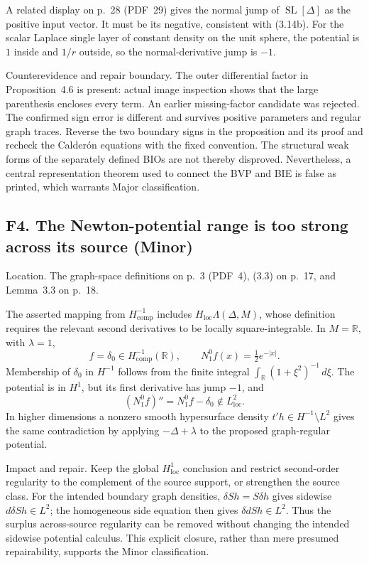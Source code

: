 \documentclass[10pt]{article}
\begin{document}
A related display on p. 28 (PDF 29) gives the normal jump of \(\operatorname{SL}[\Delta]\) as the positive input vector. It must be its negative, consistent with (3.14b). For the scalar Laplace single layer of constant density on the unit sphere, the potential is \(1\) inside and \(1/r\) outside, so the normal-derivative jump is \(-1\).\par
Counterevidence and repair boundary. The outer differential factor in Proposition 4.6 is present: actual image inspection shows that the large parenthesis encloses every term. An earlier missing-factor candidate was rejected. The confirmed sign error is different and survives positive parameters and regular graph traces. Reverse the two boundary signs in the proposition and its proof and recheck the Calderón equations with the fixed convention. The structural weak forms of the separately defined BIOs are not thereby disproved. Nevertheless, a central representation theorem used to connect the BVP and BIE is false as printed, which warrants Major classification.\par
\subsection*{F4. The Newton-potential range is too strong across its source (Minor)}
Location. The graph-space definitions on p. 3 (PDF 4), (3.3) on p. 17, and Lemma 3.3 on p. 18.\par
The asserted mapping from \(H^{-1}_{\mathrm{comp}}\) includes \(H_{\mathrm{loc}}\Lambda(\Delta,M)\), whose definition requires the relevant second derivatives to be locally square-integrable. In \(M=\mathbb R\), with \(\lambda=1\), \[f=\delta_0\in H^{-1}_{\mathrm{comp}}(\mathbb R),\qquad
 N_1^0f(x)=\tfrac12e^{-|x|}.\] Membership of \(\delta_0\) in \(H^{-1}\) follows from the finite integral \(\int_\mathbb R(1+\xi^2)^{-1}\,d\xi\). The potential is in \(H^1\), but its first derivative has jump \(-1\), and \[(N_1^0f)''=N_1^0f-\delta_0\notin L^2_{\mathrm{loc}}.\] In higher dimensions a nonzero smooth hypersurface density \(t'h\in H^{-1}\setminus L^2\) gives the same contradiction by applying \(-\Delta+\lambda\) to the proposed graph-regular potential.\par
Impact and repair. Keep the global \(H^1_{\mathrm{loc}}\) conclusion and restrict second-order regularity to the complement of the source support, or strengthen the source class. For the intended boundary graph densities, \(\delta S h=S\delta h\) gives sidewise \(d\delta S h\in L^2\); the homogeneous side equation then gives \(\delta dS h\in L^2\). Thus the surplus across-source regularity can be removed without changing the intended sidewise potential calculus. This explicit closure, rather than mere presumed repairability, supports the Minor classification.\par
\end{document}
